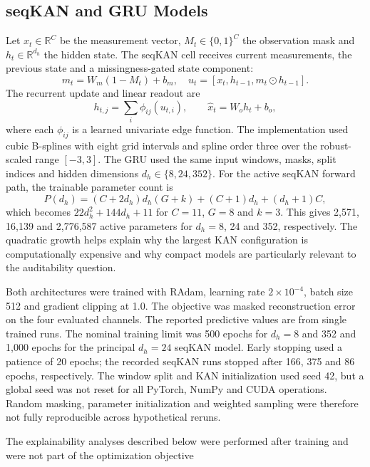 \documentclass[conference]{IEEEtran}
\begin{document}
\subsection{seqKAN and GRU Models}
Let $x_t\in\mathbb{R}^{C}$ be the measurement vector, $M_t\in\{0,1\}^{C}$ the observation mask and $h_t\in\mathbb{R}^{d_h}$ the hidden state. The seqKAN cell receives current measurements, the previous state and a missingness-gated state component:
\begin{equation}
 m_t=W_m(1-M_t)+b_m,\quad
 u_t=[x_t,h_{t-1},m_t\odot h_{t-1}].
\label{eq:input}
\end{equation}
The recurrent update and linear readout are
\begin{equation}
 h_{t,j}=\sum_i \phi_{ij}(u_{t,i}),\qquad
 \hat{x}_t=W_o h_t+b_o,
\label{eq:kan}
\end{equation}
where each $\phi_{ij}$ is a learned univariate edge function. The implementation used cubic B-splines with eight grid intervals and spline order three over the robust-scaled range $[-3,3]$. The GRU used the same input windows, masks, split indices and hidden dimensions $d_h\in\{8,24,352\}$. For the active seqKAN forward path, the trainable parameter count is
\begin{equation}
P(d_h)=(C+2d_h)d_h(G+k)+(C+1)d_h+(d_h+1)C,
\label{eq:params}
\end{equation}
which becomes $22d_h^2+144d_h+11$ for $C=11$, $G=8$ and $k=3$. This gives 2,571, 16,139 and 2,776,587 active parameters for $d_h=8$, 24 and 352, respectively. The quadratic growth helps explain why the largest KAN configuration is computationally expensive and why compact models are particularly relevant to the auditability question.

Both architectures were trained with RAdam, learning rate $2\times10^{-4}$, batch size 512 and gradient clipping at 1.0. The objective was masked reconstruction error on the four evaluated channels. The reported predictive values are from single trained runs. The nominal training limit was 500 epochs for $d_h=8$ and 352 and 1,000 epochs for the principal $d_h=24$ seqKAN model. Early stopping used a patience of 20 epochs; the recorded seqKAN runs stopped after 166, 375 and 86 epochs, respectively. The window split and KAN initialization used seed 42, but a global seed was not reset for all PyTorch, NumPy and CUDA operations. Random masking, parameter initialization and weighted sampling were therefore not fully reproducible across hypothetical reruns.

The explainability analyses described below were performed after training and were not part of the optimization objective
\end{document}
